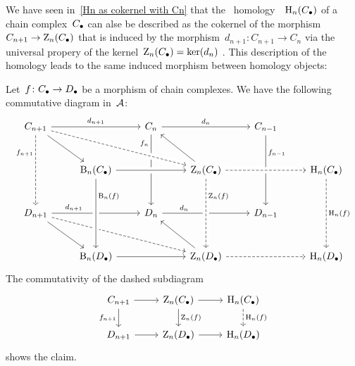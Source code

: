 \begin{remark*}
  We have seen in~\cref{Hn as cokernel with Cn} that the~ homology~~$\operatorname{H}_n(C_\bullet)$ of a chain complex~$C_\bullet$ can alse be described as the cokernel of the morphism~$C_{n+1} \to \operatorname{Z}_n(C_\bullet)$ that is induced by the morphism~$d_{n+1} \colon C_{n+1} \to C_n$ via the universal propery of the kernel~$\operatorname{Z}_n(C_\bullet) = \ker(d_n)$ .
  This description of the~ homology leads to the same induced morphism between homology objects:
  
  Let~$f \colon C_\bullet \to D_\bullet$ be a morphism of chain complexes.
  We have the following commutative diagram in~$\mathcal{A}$:
  \[
    \begin{tikzcd}[row sep = large]
        C_{n+1}
        \arrow{rr}[above]{d_{n+1}}
        \arrow[dashed]{dd}[left, near start]{f_{n+1}}
        \arrow{dr}
      & {}
      & C_n
        \arrow{rr}[above]{d_n}
        \arrow{dd}[left, very near start]{f_n}
      & {}
      & C_{n-1}
        \arrow{dd}[right, near start]{f_{n-1}}
      & {}
      \\
        {}
      & \Bl_n(\Ccc)
      & {}
      & \Zl_n(\Ccc)
        \arrow{ul}
        \arrow[dashed, from=ulll, crossing over]
        \arrow[from=ll, crossing over]
      & {}
      & \Hl_n(\Ccc)
        \arrow[dashed,from=ll, crossing over]
        \arrow[dashed]{dd}[right]{\Hl_n(f)}
      \\
        D_{n+1}
        \arrow{rr}[above, near start]{d_{n+1}}
        \arrow[dashed]{drrr}
        \arrow{dr}
      & {}
      & D_n
        \arrow{rr}[above, near start]{d_n}
      & {}
      & D_{n-1}
      & {}
      \\
        {}
      & \Bl_n(\Dcc)
        \arrow{rr}
        \arrow[from=uu, crossing over, "\Bl_n(f)", near start]
      & {}
      & \Zl_n(\Dcc)
        \arrow{ul}
        \arrow[dashed]{rr}
        \arrow[dashed,from=uu, crossing over, "\Zl_n(f)", near start]
      & {}
      & \Hl_n(\Dcc)
    \end{tikzcd}
  \]
  The commutativity of the dashed subdiagram
  \[
    \begin{tikzcd}
        C_{n+1}
        \arrow{r}
        \arrow{d}[left]{f_{n+1}}
      & \Zl_n(\Ccc)
        \arrow{r}
        \arrow{d}[right]{\Zl_n(f)}
      & \Hl_n(\Ccc)
        \arrow[dashed]{d}[right]{\Hl_n(f)}
      \\
        D_{n+1}
        \arrow{r}
      & \Zl_n(\Dcc)
        \arrow{r}
      & \Hl_n(\Dcc)
    \end{tikzcd}
  \]
  shows the claim.
\end{remark*}



